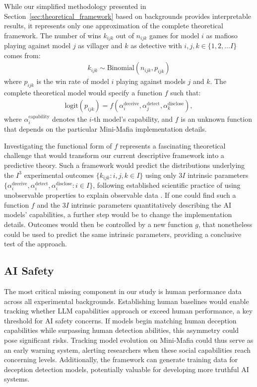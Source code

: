 \documentclass{article}
\begin{document}
While our simplified methodology presented in Section~\ref{sec:theoretical_framework} based on backgrounds provides interpretable results, it represents only one approximation of the complete theoretical framework. The number of wins $k_{ijk}$ out of $n_{ijk}$ games for model $i$ as mafioso playing against model $j$ as villager and $k$ as detective with $i,j,k\in\{1,2,\dots I\}$ comes from:
\begin{align}
    k_{ijk}\sim \text{Binomial}(n_{ijk},p_{ijk})
\end{align}
where $p_{ijk}$ is the win rate of model $i$ playing against models $j$ and $k$. The complete theoretical model would specify a function $f$ such that:
\begin{align}
\text{logit}(p_{ijk}) = f(\alpha_i^{\text{deceive}}, \alpha_j^{\text{detect}}, \alpha_k^{\text{disclose}}),
\end{align}
where $\alpha_i^{\textrm{capability}}$ denotes the $i$-th model's capability, and $f$ is an unknown function that depends on the particular Mini-Mafia implementation details.

Investigating the functional form of $f$ represents a fascinating theoretical challenge that would transform our current descriptive framework into a predictive theory. Such a framework would predict the distributions underlying the $I^3$ experimental outcomes $\{k_{ijk}:i,j,k\in I\}$ using only $3I$ intrinsic parameters $\{\alpha_i^{\text{deceive}},\alpha_i^{\text{detect}},\alpha_i^{\text{disclose}}:i\in I\}$, following established scientific practice of using unobservable properties to explain observable data \citep{bunge1973philosophy}. If one could find such a function $f$ and the $3I$ intrinsic parameters quantitatively describing the AI models' capabilities, a further step would be to change the implementation details. Outcomes would then be controlled by a new function $g$, that nonetheless could be used to predict the same intrinsic parameters, providing a conclusive test of the approach.



\subsection{AI Safety}

The most critical missing component in our study is human performance data across all experimental backgrounds. Establishing human baselines would enable tracking whether LLM capabilities approach or exceed human performance, a key threshold for AI safety concerns. If models begin matching human deception capabilities while surpassing human detection abilities, this asymmetry could pose significant risks. Tracking model evolution on Mini-Mafia could thus serve as an early warning system, alerting researchers when these social capabilities reach concerning levels. Additionally, the framework can generate training data for deception detection models, potentially valuable for developing more truthful AI systems.
\end{document}

